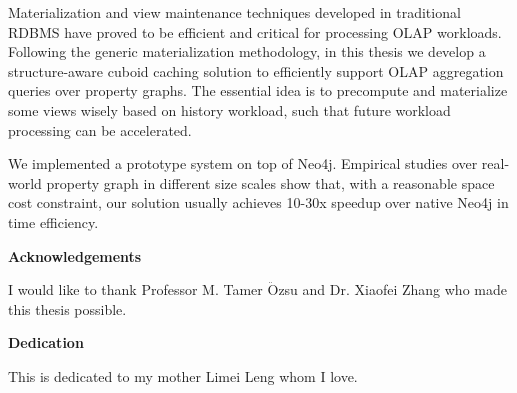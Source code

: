 Materialization and view maintenance techniques developed in traditional RDBMS have proved to be efficient and critical for processing OLAP workloads. Following the generic materialization methodology, in this thesis we develop a structure-aware cuboid caching solution to efficiently support OLAP aggregation queries over property graphs. The essential idea is to precompute and materialize some views wisely based on history workload, such that future workload processing can be accelerated. %

We implemented a prototype system on top of Neo4j. Empirical studies over real-world property graph in different size scales show that, with a reasonable space cost constraint, our solution usually achieves 10-30x speedup over native Neo4j in time efficiency.



\cleardoublepage


\begin{center}\textbf{Acknowledgements}\end{center}

I would like to thank Professor M. Tamer {$\ddot{\mbox{O}}$}zsu and Dr. Xiaofei Zhang who made this thesis possible.
\cleardoublepage


\begin{center}\textbf{Dedication}\end{center}

This is dedicated to my mother Limei Leng whom I love.
\cleardoublepage

\renewcommand\contentsname{Table of Contents}
\tableofcontents
\cleardoublepage
{}    %

\listoftables
\cleardoublepage
{}		%

\listoffigures
\cleardoublepage
{}		%

\printglossaries
\cleardoublepage
{}		%


